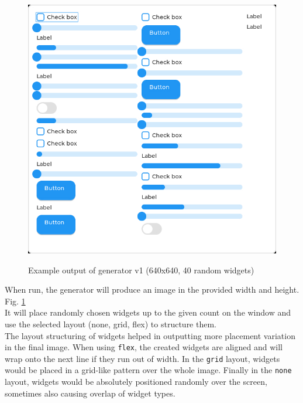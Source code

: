 \documentclass[Bachelor, BIC, english, fhCitStyle, IEEE]{BASE/twbook} %
\def\code#1{\texttt{#1}}
\begin{document}
\begin{figure}
    \caption{Example output of generator v1 (640x640, 40 random widgets)}
    \centering
    \includegraphics[width=\textwidth]{generator_v1_example.jpg}
    \label{fig:genv1example}
\end{figure}
When run, the generator will produce an image in the provided width and height. Fig. \ref{fig:genv1example}\\It will place randomly chosen widgets up to the given count on the window and use the selected layout (none, grid, flex) to structure them.
\\
The layout structuring of widgets helped in outputting more placement variation in the final image. When using \code{flex}, the created widgets are aligned and will wrap onto the next line if they run out of width. In the \code{grid} layout, widgets would be placed in a grid-like pattern over the whole image. Finally in the \code{none} layout, widgets would be absolutely positioned randomly over the screen, sometimes also causing overlap of widget types.
\clearpage
\end{document}
